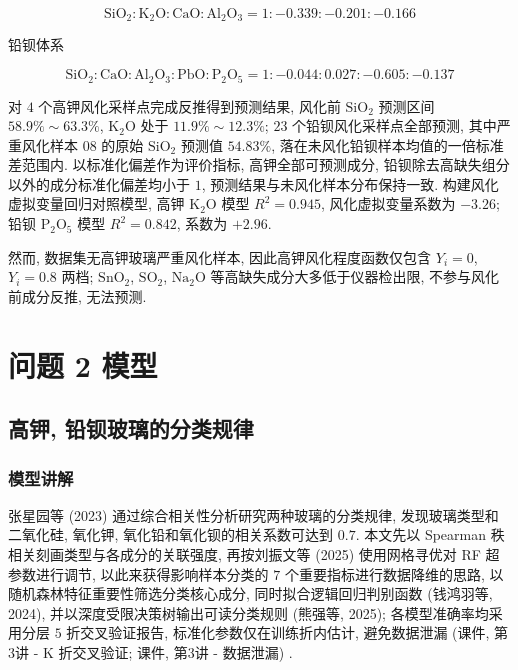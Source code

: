 \documentclass{ctexart}
\begin{document}
\begin{equation*}
\mathrm{SiO_2}:\mathrm{K_2O}:\mathrm{\mathrm{CaO}}:\mathrm{Al_2O_3}=1:-0.339:-0.201:-0.166
\end{equation*}

铅钡体系

\begin{equation*}
\mathrm{SiO_2}:\mathrm{\mathrm{CaO}}:\mathrm{Al_2O_3}:\mathrm{\mathrm{PbO}}:\mathrm{P_2O_5}=1:-0.044:0.027:-0.605:-0.137
\end{equation*}

对 $4$ 个高钾风化采样点完成反推得到预测结果, 风化前 $\mathrm{SiO_2}$ 预测区间 $58.9\%\sim63.3\%$, $\mathrm{K_2O}$ 处于 $11.9\%\sim12.3\%$; $23$ 个铅钡风化采样点全部预测, 其中严重风化样本 08 的原始 $\mathrm{SiO_2}$ 预测值 $54.83\%$, 落在未风化铅钡样本均值的一倍标准差范围内. 以标准化偏差作为评价指标, 高钾全部可预测成分, 铅钡除去高缺失组分以外的成分标准化偏差均小于 $1$, 预测结果与未风化样本分布保持一致. 构建风化虚拟变量回归对照模型, 高钾 $\mathrm{K_2O}$ 模型 $R^2=0.945$, 风化虚拟变量系数为 $-3.26$; 铅钡 $\mathrm{P_2O_5}$ 模型 $R^2=0.842$, 系数为 $+2.96$.

然而, 数据集无高钾玻璃严重风化样本, 因此高钾风化程度函数仅包含 $Y_i=0$, $Y_i=0.8$ 两档; $\mathrm{SnO_2}$, $\mathrm{SO_2}$, $\mathrm{Na_2O}$ 等高缺失成分大多低于仪器检出限, 不参与风化前成分反推, 无法预测.

\section{问题 2 模型}

\subsection{高钾, 铅钡玻璃的分类规律}

\subsubsection{模型讲解}

张星园等 (2023) \cite{zhangxingyuan2023}通过综合相关性分析研究两种玻璃的分类规律, 发现玻璃类型和二氧化硅, 氧化钾, 氧化铅和氧化钡的相关系数可达到 $0.7$. 本文先以 Spearman 秩相关刻画类型与各成分的关联强度, 再按刘振文等 (2025) 使用网格寻优对 RF 超参数进行调节, 以此来获得影响样本分类的 $7$ 个重要指标进行数据降维的思路, 以随机森林特征重要性筛选分类核心成分, 同时拟合逻辑回归判别函数 (钱鸿羽等, 2024), 并以深度受限决策树输出可读分类规则 (熊强等, 2025); 各模型准确率均采用分层 $5$ 折交叉验证报告, 标准化参数仅在训练折内估计, 避免数据泄漏 (课件, 第3讲 - K 折交叉验证; 课件, 第3讲 - 数据泄漏) \cite{kejian2026}.
\end{document}
